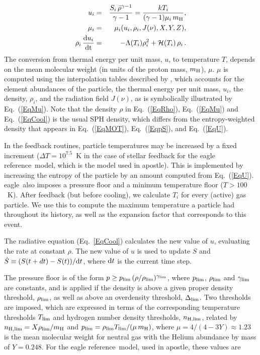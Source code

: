 \documentclass[10pt, a4paper]{article}
\newcommand{\eagle}{{\sc eagle}}
\newcommand{\apostle}{{\sc apostle}}
\newcommand{\REF}{{\sc eagle reference}}
\begin{document}
\begin{eqnarray}
\label{EqU}
u_i &=& {S_i\,\bar{\rho}^{\gamma-1}\over \gamma-1} = {kT_i\over (\gamma-1)\mu_i\,m_{\rm H}},\\
\label{EqMu}
\mu_i &=& \mu_i(u_i, \rho_i, J(\nu), X, Y, Z),\\
\label{EqCool}
\rho_i\,{{\rm d}u_i\over {\rm dt}} &=& -\Lambda(T_i)\rho_i^2+{\cal H}(T_i)\,\rho_i\,.
\end{eqnarray}
The conversion from thermal energy per unit mass, $u$, to temperature $T$,
depends on the mean molecular weight (in units of the proton mass, $m_{\rm
H}$), $\mu$. $\mu$ is computed using the interpolation tables described by
\cite{2009MNRAS.393...99W}, which accounts for the element abundances of the particle,
the thermal energy per unit mass, $u_i$, the density, $\rho_i$, and the
radiation field $J(\nu)$, as is symbolically illustrated by Eq.~(\ref{EqMu}).
Note that the density $\rho$ in Eq.~(\ref{EqRho}), Eq.~(\ref{EqMu}) and
Eq.~(\ref{EqCool}) is the usual SPH density, which differs from the
entropy-weighted density that appears in Eq.~(\ref{EqMOT}), Eq.~(\ref{EqpS}),
and Eq.~(\ref{EqU}).

In the feedback routines, particle temperatures may be increased by a fixed
increment ($\Delta T=10^{7.5}$~K in the case of stellar feedback for the \REF\ model,
which is the model used in \apostle). This is implemented by increasing the entropy of the particle
by an amount computed from Eq.~(\ref{EqU}). \eagle\ also imposes a pressure
floor and a minimum temperature floor ($T>100$~K). After feedback (but before
cooling), we calculate $T_i$ for every (active) gas particle. We use this to
compute the maximum temperature a particle had throughout its history, as well
as the expansion factor that corresponds to this event.

The radiative equation (Eq.~\ref{EqCool}) calculates the new value of $u$,
evaluating the rate at constant $\rho$. The new value of $u$ is used to update
$S$ and $\dot S\equiv (S(t+dt)-S(t))/{\rm d}t$, where ${\rm d}t$ is the current
time step.

The pressure floor is of the form $p\ge p_{\rm lim}\,(\rho/\rho_{\rm
lim})^{\gamma_{\rm lim}}$,  where $p_{\rm lim}$, $\rho_{\rm lim}$ and
$\gamma_{\rm lim}$ are constants, and is applied if the density is above a
given proper density threshold, $\rho_{\rm lim}$, as well as above an
overdensity threshold, $\Delta_{\rm lim}$. Two thresholds are imposed, which
are expressed in terms of the corresponding temperature thresholds $T_{\rm
lim}$ and hydrogen number density thresholds, $n_{\rm H, lim}$, related by
$n_{\rm H, lim}=X\rho_{\rm lim}/m_{\rm H}$ and $p_{\rm lim}=\rho_{\rm
lim}T_{\rm lim}/(\mu\,m_{\rm H})$, where $\mu=4/(4-3Y)\approx 1.23$ is the mean
molecular weight for neutral gas with the \cite{2014A&A...571A..16P} Helium abundance by
mass of $Y=0.248$. For the \REF\ model, used in \apostle, these values are
\end{document}
